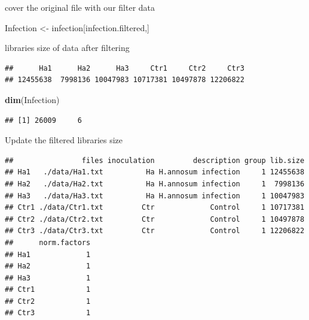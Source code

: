 \documentclass[
]{article}
\newenvironment{Shaded}{\begin{snugshade}}{\end{snugshade}}
\newcommand{\FunctionTok}[1]{\textcolor[rgb]{0.13,0.29,0.53}{\textbf{#1}}}
\newcommand{\NormalTok}[1]{#1}
\newcommand{\OtherTok}[1]{\textcolor[rgb]{0.56,0.35,0.01}{#1}}
\newcommand{\SpecialCharTok}[1]{\textcolor[rgb]{0.81,0.36,0.00}{\textbf{#1}}}
\begin{document}
cover the original file with our filter data

\begin{Shaded}
\begin{Highlighting}[]
\NormalTok{Infection }\OtherTok{\textless{}{-}}\NormalTok{ infection[infection.filtered,]}
\end{Highlighting}
\end{Shaded}

libraries size of data after filtering

\begin{Shaded}
\end{Shaded}

\begin{verbatim}
##      Ha1      Ha2      Ha3     Ctr1     Ctr2     Ctr3 
## 12455638  7998136 10047983 10717381 10497878 12206822
\end{verbatim}

\begin{Shaded}
\begin{Highlighting}[]
\FunctionTok{dim}\NormalTok{(Infection)}
\end{Highlighting}
\end{Shaded}

\begin{verbatim}
## [1] 26009     6
\end{verbatim}

Update the filtered libraries size

\begin{Shaded}
\end{Shaded}

\begin{verbatim}
##                files inoculation         description group lib.size
## Ha1   ./data/Ha1.txt          Ha H.annosum infection     1 12455638
## Ha2   ./data/Ha2.txt          Ha H.annosum infection     1  7998136
## Ha3   ./data/Ha3.txt          Ha H.annosum infection     1 10047983
## Ctr1 ./data/Ctr1.txt         Ctr             Control     1 10717381
## Ctr2 ./data/Ctr2.txt         Ctr             Control     1 10497878
## Ctr3 ./data/Ctr3.txt         Ctr             Control     1 12206822
##      norm.factors
## Ha1             1
## Ha2             1
## Ha3             1
## Ctr1            1
## Ctr2            1
## Ctr3            1
\end{verbatim}
\end{document}
